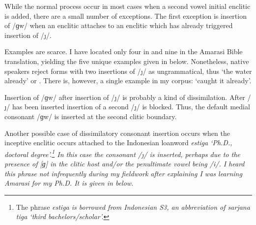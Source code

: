 While the normal process occur in most cases
when a second vowel initial enclitic is added,
there are a small number of exceptions.
The first exception is insertion of /ɡw/
when an enclitic attaches to an enclitic which has
already triggered insertion of /\j/.

Examples are scarce.
I have located only four in \citet{or16c} and nine
in the Amarasi Bible translation,
yielding the five unique examples given in  below.
Nonetheless, native speakers reject forms with two insertions of /\j/ as ungrammatical, thus
 `the water already' or .
There is, however, a single example in my corpus:  `caught it already'.

\begin{exe}
\end{exe}

Insertion of /ɡw/ after insertion of /\j/ is probably a kind of dissimilation.
After /\j/ has been inserted insertion of a second /\j/ is blocked.
Thus, the default medial consonant /ɡw/ is inserted at the second clitic boundary.

Another possible case of dissimilatory consonant insertion occurs
when the inceptive enclitic  occurs attached
to the Indonesian loanword \it{estiga} `Ph.D., doctoral degree'.\footnote{
		The phrase \it{estiga} is borrowed from Indonesian S3,
		an abbreviation of \it{sarjana tiga} `third bachelors/scholar'.}
In this case the consonant /\j/ is inserted,
perhaps due to the presence of [ɡ] in the clitic host
and/or the penultimate vowel being /i/.
I heard this phrase not infrequently during my fieldwork
after explaining I was learning Amarasi for my Ph.D.
It is given in  below.

